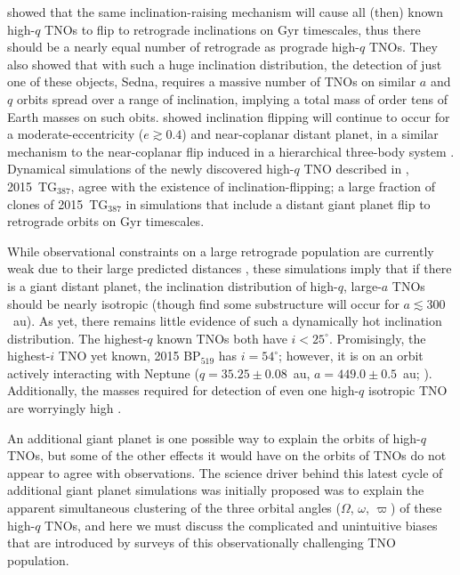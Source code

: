 \documentclass[preprint]{aastex62}
\begin{document}
\citet{shankman17} showed that the same inclination-raising mechanism will cause all (then) known high-$q$ TNOs to flip to retrograde inclinations on Gyr timescales, thus there should be a nearly equal number of retrograde as prograde high-$q$ TNOs.
They also showed that with such a huge inclination distribution, the detection of just one of these objects, Sedna, requires a massive number of TNOs on similar $a$ and $q$ orbits spread over a range of inclination, implying a total mass of order tens of Earth masses on such obits.
\citet{Lietal2018} showed inclination flipping will continue to occur for a moderate-eccentricity ($e \gtrsim 0.4$) and near-coplanar distant planet, in a similar mechanism to the near-coplanar flip induced in a hierarchical three-body system \citep{Li:2014}.
Dynamical simulations of the newly discovered high-$q$ TNO described in \citet{sheppard18}, 2015~TG$_{387}$, agree with the existence of inclination-flipping; a large fraction of clones of 2015~TG$_{387}$ in simulations that include a distant giant planet flip to retrograde orbits on Gyr timescales.

While observational constraints on a large retrograde population are currently weak due to their large predicted distances \citep{lawler2017,lawler2018}, these simulations imply that if there is a giant distant planet, the inclination distribution of high-$q$, large-$a$ TNOs should be nearly isotropic (though \citealt{Lietal2018} find some substructure will occur for $a \lesssim 300$~au).
As yet, there remains little evidence of such a dynamically hot inclination distribution.
The highest-$q$ known TNOs both have $i<25^{\circ}$. 
Promisingly, the highest-$i$ TNO yet known, 2015 BP$_{519}$ has $i=54^{\circ}$; however, it is on an orbit actively interacting with Neptune ($q = 35.25 \pm 0.08$~au, $ a= 449.0 \pm 0.5$~au; \citealt{becker18}).
Additionally, the masses required for detection of even one high-$q$ isotropic TNO are worryingly high \citep{shankman17}. 

An additional giant planet is one possible way to explain the orbits of high-$q$ TNOs, but some of the other effects it would have on the orbits of TNOs do not appear to agree with observations.
The science driver behind this latest cycle of additional giant planet simulations was initially proposed was to explain the apparent simultaneous clustering of the three orbital angles ($\Omega$, $\omega$, $\varpi$) of these high-$q$ TNOs, and here we must discuss the complicated and unintuitive biases that are introduced by surveys of this observationally challenging TNO population.
\end{document}
